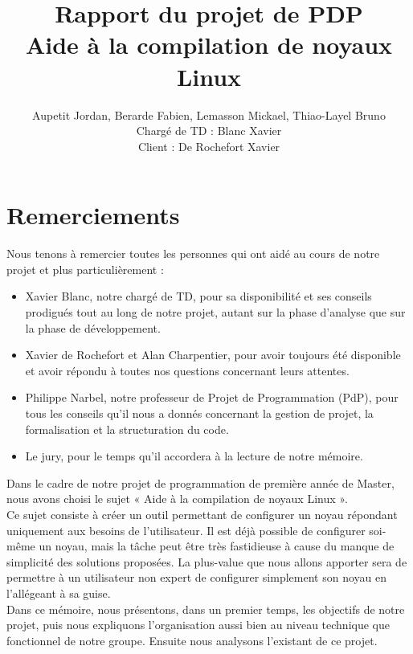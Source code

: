 \documentclass[17pts]{report}
\title{Rapport du projet de PDP \\ Aide à la compilation de noyaux Linux}
\author{Aupetit Jordan, Berarde Fabien, Lemasson Mickael, Thiao-Layel Bruno \\
        Chargé de TD : Blanc Xavier\\
        Client : De Rochefort Xavier}
\begin{document}
\maketitle
\newpage
\pagestyle{empty}
\chapter*{Remerciements}

Nous tenons à remercier toutes les personnes qui ont aidé au cours de notre
projet et plus particulièrement :\\

\begin{itemize}
  \item Xavier Blanc, notre chargé de TD, pour sa disponibilité et ses conseils
      prodigués tout au long de notre projet, autant sur la phase d'analyse que
      sur la phase de développement.
  \item Xavier de Rochefort et Alan Charpentier, pour avoir toujours été
      disponible et avoir répondu à toutes nos questions concernant leurs
      attentes.
  \item Philippe Narbel, notre professeur de Projet de Programmation (PdP), pour tous
      les conseils qu'il nous a donnés concernant la gestion de projet, la
      formalisation et la structuration du code.
  \item Le jury, pour le temps qu'il accordera à la lecture de notre mémoire.
\end{itemize}

\tableofcontents
\clearpage
\listoffigures
\clearpage

\pagestyle{IHA-fancy-style}

Dans le cadre de notre projet de programmation de première année de Master,
nous avons choisi le sujet « Aide à la compilation de noyaux Linux ».  \\

Ce sujet consiste à créer un outil permettant de configurer un noyau répondant
uniquement aux besoins de l'utilisateur. Il est déjà possible de configurer
soi-même un noyau, mais la tâche peut être très fastidieuse à cause du manque
de simplicité des solutions proposées. La plus-value que nous allons apporter
sera de permettre à un utilisateur non expert de configurer simplement son
noyau en l'allégeant à sa guise.  \\

Dans ce mémoire, nous présentons, dans un premier temps, les objectifs de notre
projet, puis nous expliquons l’organisation aussi bien au niveau technique que
fonctionnel de notre groupe. Ensuite nous analysons l'existant de ce projet.
\\
\end{document}
